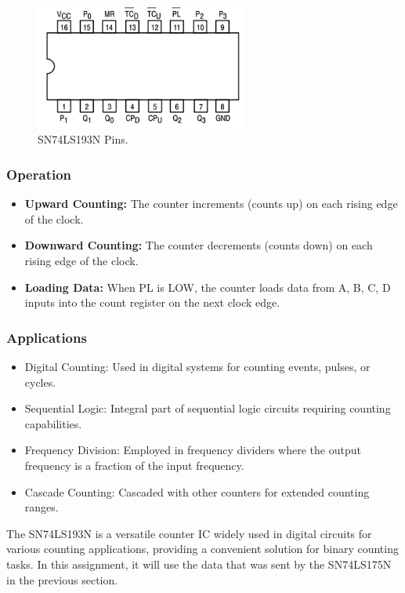 \documentclass{article}
\begin{document}
\begin{figure}[h]
    \centering
    \includegraphics[width=7cm]{Pic/Pictures/193N.png}
    \caption{SN74LS193N Pins.}
    \label{fig:enter-label}
\end{figure}

\newpage

\subsubsection{Operation}
\begin{itemize}
    \item \textbf{Upward Counting:} The counter increments (counts up) on each rising edge of the clock.
    \item \textbf{Downward Counting:} The counter decrements (counts down) on each rising edge of the clock.
    \item \textbf{Loading Data:} When PL is LOW, the counter loads data from A, B, C, D inputs into the count register on the next clock edge.
\end{itemize}




\subsubsection{Applications}
\begin{itemize}
    \item Digital Counting: Used in digital systems for counting events, pulses, or cycles.
    \item Sequential Logic: Integral part of sequential logic circuits requiring counting capabilities.
    \item Frequency Division: Employed in frequency dividers where the output frequency is a fraction of the input frequency.
    \item Cascade Counting: Cascaded with other counters for extended counting ranges.
\end{itemize}

The SN74LS193N is a versatile counter IC widely used in digital circuits for various counting applications, providing a convenient solution for binary counting tasks. In this assignment, it will use the data that was sent by the SN74LS175N in the previous section.\par
\end{document}
